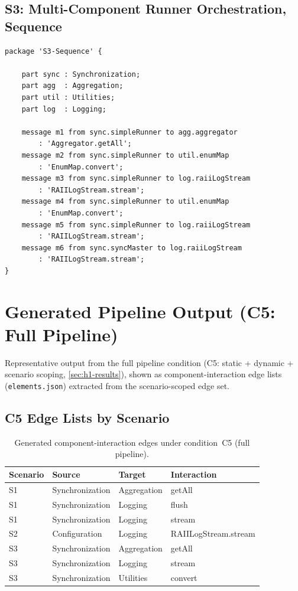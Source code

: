 \subsection{S3: Multi-Component Runner Orchestration, Sequence}

\begin{verbatim}
package 'S3-Sequence' {

    part sync : Synchronization;
    part agg  : Aggregation;
    part util : Utilities;
    part log  : Logging;

    message m1 from sync.simpleRunner to agg.aggregator
        : 'Aggregator.getAll';
    message m2 from sync.simpleRunner to util.enumMap
        : 'EnumMap.convert';
    message m3 from sync.simpleRunner to log.raiiLogStream
        : 'RAIILogStream.stream';
    message m4 from sync.simpleRunner to util.enumMap
        : 'EnumMap.convert';
    message m5 from sync.simpleRunner to log.raiiLogStream
        : 'RAIILogStream.stream';
    message m6 from sync.syncMaster to log.raiiLogStream
        : 'RAIILogStream.stream';
}
\end{verbatim}

\section{Generated Pipeline Output (C5: Full Pipeline)}
\label{sec:appendix-generated}

Representative output from the full pipeline condition (C5: static +
dynamic + scenario scoping, \cref{sec:h1-results}), shown as
component-interaction edge lists (\texttt{elements.json}) extracted
from the scenario-scoped edge set.

\subsection{C5 Edge Lists by Scenario}

\begin{table}[h]
\centering
\caption{Generated component-interaction edges under condition~C5 (full pipeline).}
\label{tab:c5-edges}
\begin{tabular}{llll}
\toprule
\textbf{Scenario} & \textbf{Source} & \textbf{Target} & \textbf{Interaction} \\
\midrule
S1 & Synchronization & Aggregation & getAll \\
S1 & Synchronization & Logging     & flush \\
S1 & Synchronization & Logging     & stream \\
\midrule
S2 & Configuration   & Logging     & RAIILogStream.stream \\
\midrule
S3 & Synchronization & Aggregation & getAll \\
S3 & Synchronization & Logging     & stream \\
S3 & Synchronization & Utilities   & convert \\
\bottomrule
\end{tabular}
\end{table}

